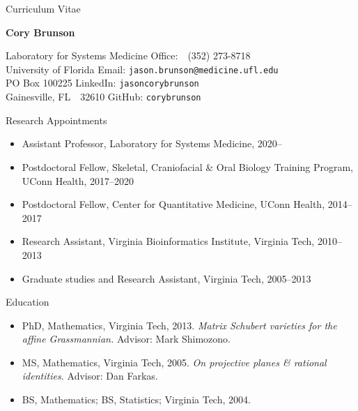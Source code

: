 \documentclass[10pt,a4paper]{article}
\begin{document}
\frenchspacing
\pagestyle{empty}
\setlength{\parindent}{0cm}

\centerline{\sc Curriculum Vitae}
\vspace{.25cm}
\centerline{\large\bfseries Cory Brunson}

\vspace{.75cm}
Laboratory for Systems Medicine \hfill Office:\ \ (352) 273-8718 \\
University of Florida \hfill Email: {\tt\small jason.brunson@medicine.ufl.edu} \\
PO Box 100225  \hfill LinkedIn: {\tt\small\nolinkurl{jasoncorybrunson}} \\
Gainesville, FL\ \ 32610 \hfill GitHub: {\tt\small\nolinkurl{corybrunson}}

\vspace{.25cm}
{\sc Research Appointments}
\begin{itemize}[label=$\circ$,nolistsep]
\item
Assistant Professor, Laboratory for Systems Medicine, 2020--
\item
Postdoctoral Fellow, Skeletal, Craniofacial \& Oral Biology Training Program, UConn Health, 2017--2020
\item
Postdoctoral Fellow, Center for Quantitative Medicine, UConn Health, 2014--2017
\item
Research Assistant, Virginia Bioinformatics Institute, Virginia Tech, 2010--2013
\item
Graduate studies and Research Assistant, Virginia Tech, 2005--2013
\end{itemize}

\vspace{.25cm}
{\sc Education}
\begin{itemize}[label=$\circ$,nolistsep]
\item
PhD, Mathematics, Virginia Tech, 2013.
{\itshape Matrix Schubert varieties for the affine Grassmannian.}
Advisor: Mark Shimozono.
\item
MS, Mathematics, Virginia Tech, 2005.
{\itshape On projective planes \& rational identities.}
Advisor: Dan Farkas.
\item
BS, Mathematics; BS, Statistics; Virginia Tech, 2004.
\end{itemize}

\end{document}
